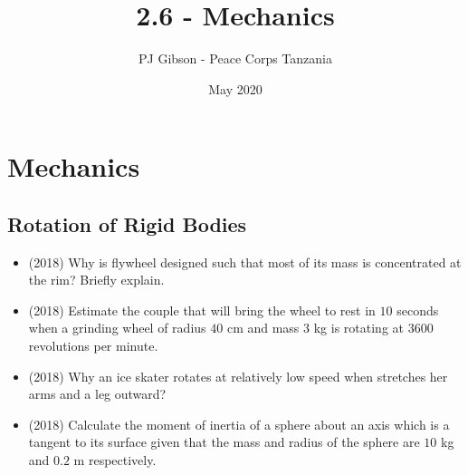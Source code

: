 \documentclass{article}
\title{2.6 - Mechanics}
\author{PJ Gibson - Peace Corps Tanzania}
\date{May 2020}
\begin{document}
\maketitle


\section{Mechanics}

\subsection{Rotation of Rigid Bodies}
\begin{itemize}
\item (2018)  Why is flywheel designed such that most of its mass is concentrated at the rim? Briefly explain. 
\item (2018)  Estimate the couple that will bring the wheel to rest in $ 10$ seconds when a grinding wheel of radius $ 40$ cm and mass $ 3$ kg is rotating at $ 3600$ revolutions per minute. 
\item (2018)  Why an ice skater rotates at relatively low speed when stretches her arms and a leg outward? 
\item (2018)  Calculate the moment of inertia of a sphere about an axis which is a tangent to its surface given that the mass and radius of the sphere are $ 10$ kg and $ 0.2$ m respectively. 
\end{itemize}
\end{document}
